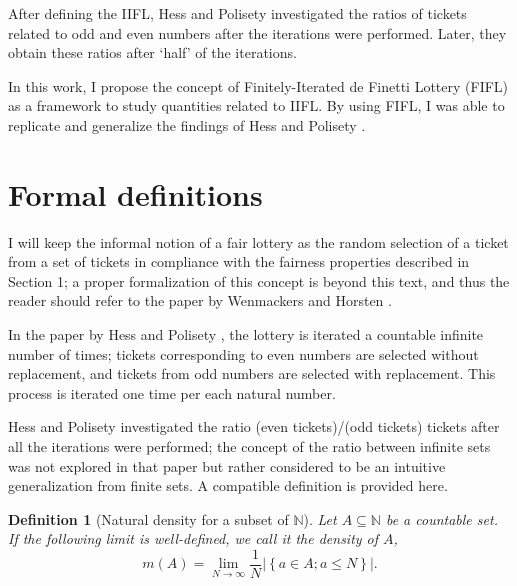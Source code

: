 \documentclass{article}
\newtheorem{definition}{Definition}
\newcommand{\N}{\mathbb{N}}
\newcommand{\card}[1]{\left| #1 \right|}
\newcommand{\sset}[1]{\left\{ #1 \right\}}
\newcommand{\ppar}[1]{\left( #1 \right)}
\begin{document}
After defining the IIFL, Hess and Polisety \cite{hess2023} investigated the ratios of tickets related to odd and even numbers after the iterations were performed.
%
Later, they obtain these ratios after `half' of the iterations.

In this work, I propose the concept of Finitely-Iterated de Finetti Lottery (FIFL) as a framework to study quantities related to IIFL.
%
By using FIFL, I was able to replicate and generalize the findings of Hess and Polisety \cite{hess2023}.


\section{Formal definitions}

I will keep the informal notion of a fair lottery as the random selection of a ticket from a set of tickets in compliance with the fairness properties described in Section 1;
a proper formalization of this concept is beyond this text, and thus the reader should refer to the paper by Wenmackers and Horsten \cite{fair_infinite_lottery}.

In the paper by Hess and Polisety \cite{hess2023}, the lottery is iterated a countable infinite number of times; tickets corresponding to even numbers are selected without replacement, and tickets from odd numbers are selected with replacement.
%
This process is iterated one time per each natural number.

Hess and Polisety investigated the ratio (even tickets)/(odd tickets) tickets after all the iterations were performed;
%
the concept of the ratio between infinite sets was not explored in that paper but rather considered to be an intuitive generalization from finite sets.
%
A compatible definition is provided here.

\begin{definition}[Natural density for a subset of $\N$]
Let $A \subseteq \N$ be a countable set.
If the following limit is well-defined, we call it the density of $A$,
\begin{equation}
    m\ppar{A} = 
    \lim_{N\rightarrow \infty} \frac{1}{N} \card{ \sset{a\in A; a\leq N} }.
\end{equation}
\end{definition}
\end{document}
